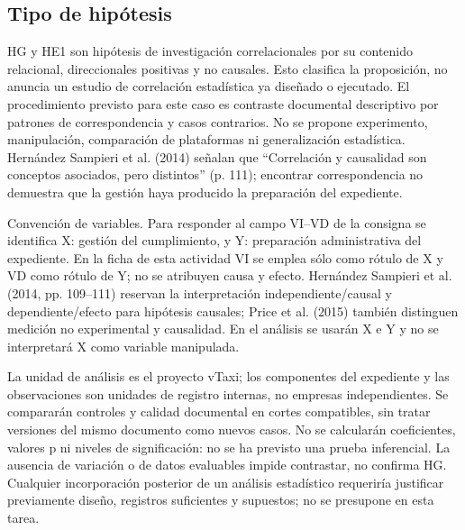 {\subsection{Tipo de hipótesis}
HG y HE1 son hipótesis de investigación correlacionales por su contenido relacional, direccionales positivas y no causales. Esto clasifica la proposición, no anuncia un estudio de correlación estadística ya diseñado o ejecutado. El procedimiento previsto para este caso es contraste documental descriptivo por patrones de correspondencia y casos contrarios. No se propone experimento, manipulación, comparación de plataformas ni generalización estadística. Hernández Sampieri et al. (2014) señalan que “Correlación y causalidad son conceptos asociados, pero distintos” (p. 111); encontrar correspondencia no demuestra que la gestión haya producido la preparación del expediente.


Convención de variables. Para responder al campo VI–VD de la consigna se identifica X: gestión del cumplimiento, y Y: preparación administrativa del expediente. En la ficha de esta actividad VI se emplea sólo como rótulo de X y VD como rótulo de Y; no se atribuyen causa y efecto. Hernández Sampieri et al. (2014, pp. 109–111) reservan la interpretación independiente/causal y dependiente/efecto para hipótesis causales; Price et al. (2015) también distinguen medición no experimental y causalidad. En el análisis se usarán X e Y y no se interpretará X como variable manipulada.


La unidad de análisis es el proyecto vTaxi; los componentes del expediente y las observaciones son unidades de registro internas, no empresas independientes. Se compararán controles y calidad documental en cortes compatibles, sin tratar versiones del mismo documento como nuevos casos. No se calcularán coeficientes, valores p ni niveles de significación: no se ha previsto una prueba inferencial. La ausencia de variación o de datos evaluables impide contrastar, no confirma HG. Cualquier incorporación posterior de un análisis estadístico requeriría justificar previamente diseño, registros suficientes y supuestos; no se presupone en esta tarea.


}
